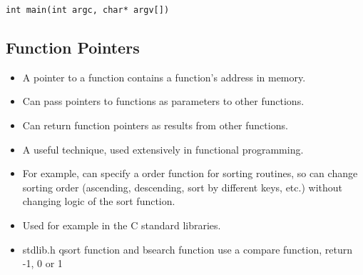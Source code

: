 \documentclass[11pt]{article}
\begin{document}
\begin{verbatim}
int main(int argc, char* argv[])
\end{verbatim}
\subsection{Function Pointers}
\label{sec-3-3}

\begin{itemize}
\item A pointer to a function contains a function's address in memory.
\item Can pass pointers to functions as parameters to other functions.
\item Can return function pointers as results from other functions.
\item A useful technique, used extensively in functional programming.
\item For example, can specify a order function for sorting routines, so
  can change sorting order (ascending, descending, sort by different keys, etc.)
  without changing logic of the sort function.
\item Used for example in the C standard libraries.
\item stdlib.h qsort function and bsearch function use a compare function, return -1, 0 or 1
\end{itemize}
\end{document}
